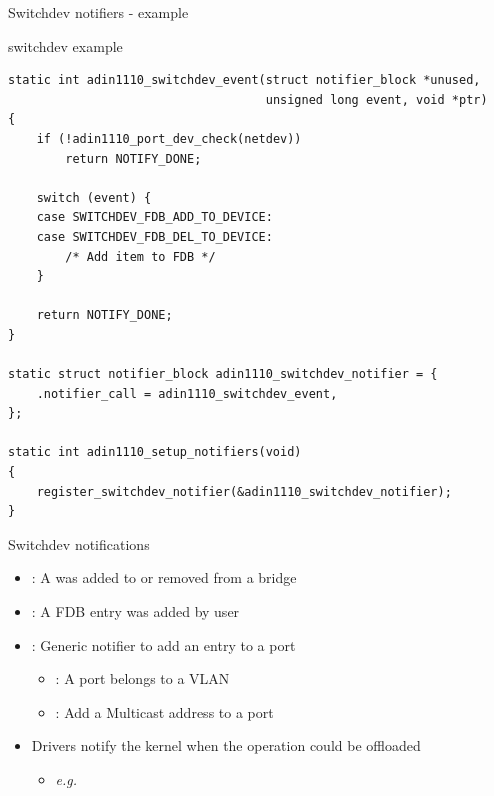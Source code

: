 \begin{frame}[fragile]{Switchdev notifiers - example}
	\begin{block}{switchdev example}
		{\fontsize{7}{8}
	\begin{verbatim}
static int adin1110_switchdev_event(struct notifier_block *unused,
                                    unsigned long event, void *ptr)
{
    if (!adin1110_port_dev_check(netdev))
        return NOTIFY_DONE;

    switch (event) {
    case SWITCHDEV_FDB_ADD_TO_DEVICE:
    case SWITCHDEV_FDB_DEL_TO_DEVICE:
        /* Add item to FDB */
    }

    return NOTIFY_DONE;
}

static struct notifier_block adin1110_switchdev_notifier = {
    .notifier_call = adin1110_switchdev_event,
};

static int adin1110_setup_notifiers(void)
{
    register_switchdev_notifier(&adin1110_switchdev_notifier);
}
\end{verbatim}
	}
	\end{block}
\end{frame}

\begin{frame}{Switchdev notifications}
	\begin{itemize}
		\item {} : A  was added to or removed from a bridge
		\item {} : A FDB entry was added by user
		\item {} : Generic notifier to add an entry to a port
			\begin{itemize}
				\item {} : A port belongs to a VLAN
				\item {} : Add a Multicast address to a port
			\end{itemize}
		\item Drivers notify the kernel when the operation could be offloaded
			\begin{itemize}
				\item \textit{e.g.} 
			\end{itemize}
	\end{itemize}
\end{frame}

